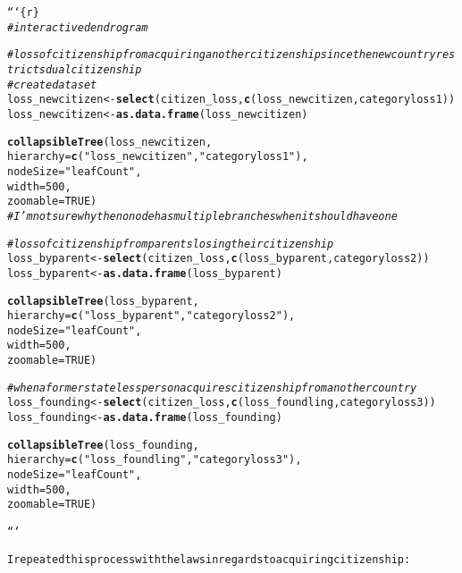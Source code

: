 \documentclass{article}\usepackage[]{graphicx}\usepackage[]{xcolor}
\makeatletter
\newcommand{\hlstr}[1]{\textcolor[rgb]{0.192,0.494,0.8}{#1}}%
\newcommand{\hlcom}[1]{\textcolor[rgb]{0.678,0.584,0.686}{\textit{#1}}}%
\newcommand{\hlkwd}[1]{\textcolor[rgb]{0.737,0.353,0.396}{\textbf{#1}}}%
\newenvironment{kframe}{%
 \def\at@end@of@kframe{}%
 \ifinner\ifhmode%
  \def\at@end@of@kframe{\end{minipage}}%
  \begin{minipage}{\columnwidth}%
 \fi\fi%
 \def\FrameCommand##1{\hskip\@totalleftmargin \hskip-\fboxsep
 \colorbox{shadecolor}{##1}\hskip-\fboxsep
     \hskip-\linewidth \hskip-\@totalleftmargin \hskip\columnwidth}%
 \MakeFramed {\advance\hsize-\width
   \@totalleftmargin\z@ \linewidth\hsize
   \@setminipage}}%
 {\par\unskip\endMakeFramed%
 \at@end@of@kframe}
\newenvironment{knitrout}{}{} %
\makeatother
\begin{document}
\begin{knitrout}
\begin{kframe}
\begin{alltt}
```\{r\}
\hlcom{# interactive dendrogram}

\hlcom{# loss of citizenship from acquiring another citizenship since the new country restricts dual citizenship}
\hlcom{# create dataset}
loss_newcitizen <- \hlkwd{select}(citizen_loss, \hlkwd{c}(loss_newcitizen, categoryloss1)) 
loss_newcitizen <- \hlkwd{as.data.frame}(loss_newcitizen)
  

\hlkwd{collapsibleTree}(loss_newcitizen, 
                hierarchy = \hlkwd{c}(\hlstr{"loss_newcitizen"}, \hlstr{"categoryloss1"}),
                nodeSize = \hlstr{"leafCount"},
                width = 500,
                zoomable = TRUE)
\hlcom{# I'm not sure why the no node has multiple branches when it should have one}

\hlcom{# loss of citizenship from parents losing their citizenship}
loss_byparent <- \hlkwd{select}(citizen_loss, \hlkwd{c}(loss_byparent, categoryloss2)) 
loss_byparent <- \hlkwd{as.data.frame}(loss_byparent)

\hlkwd{collapsibleTree}(loss_byparent, 
                hierarchy = \hlkwd{c}(\hlstr{"loss_byparent"}, \hlstr{"categoryloss2"}),
                nodeSize = \hlstr{"leafCount"},
                width = 500,
                zoomable = TRUE)

\hlcom{# when a former stateless person acquires citizenship from another country}
loss_founding <- \hlkwd{select}(citizen_loss, \hlkwd{c}(loss_foundling, categoryloss3)) 
loss_founding <- \hlkwd{as.data.frame}(loss_founding)

\hlkwd{collapsibleTree}(loss_founding, 
                hierarchy = \hlkwd{c}(\hlstr{"loss_foundling"}, \hlstr{"categoryloss3"}),
                nodeSize = \hlstr{"leafCount"},
                width = 500,
                zoomable = TRUE)

```

I repeated this process with the laws in regards to acquiring citizenship:


\end{alltt}
\end{kframe}
\end{knitrout}
\end{document}
